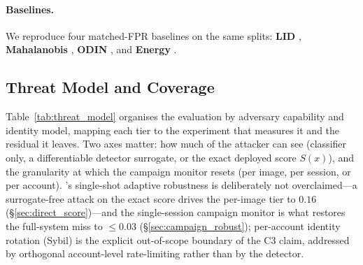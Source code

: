 \paragraph{Baselines.}
We reproduce four matched-FPR baselines on the same splits:
\textbf{LID} \cite{ma2018characterizing}, \textbf{Mahalanobis}
\cite{lee2018simple}, \textbf{ODIN} \cite{liang2018enhancing}, and
\textbf{Energy} \cite{liu2020energy}.

\subsection{Threat Model and Coverage}
\label{sec:threat_model}
Table~\ref{tab:threat_model} organises the evaluation by adversary capability
and identity model, mapping each tier to the experiment that measures it and the
residual it leaves. Two axes matter: how much of \prism the attacker can see
(classifier only, a differentiable detector surrogate, or the exact deployed
score $S(x)$), and the granularity at which the campaign monitor resets (per
image, per session, or per account). \prism's single-shot adaptive robustness is
deliberately not overclaimed---a surrogate-free attack on the exact score drives
the per-image tier to $0.16$ (\S\ref{sec:direct_score})---and the single-session
campaign monitor is what restores the full-system miss to ${\le}0.03$
(\S\ref{sec:campaign_robust}); per-account identity rotation (Sybil) is the
explicit out-of-scope boundary of the C3 claim, addressed by orthogonal
account-level rate-limiting rather than by the detector.

